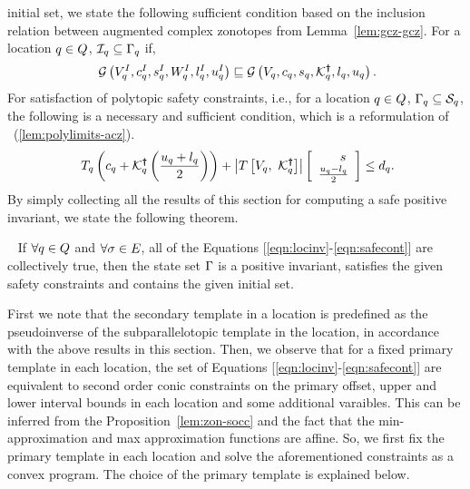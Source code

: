 initial set, we state the following sufficient condition based on the
inclusion relation between augmented complex zonotopes from
Lemma~\ref{lem:gcz-gcz}.
%
 For a location $q \in Q$, $\mathcal{I}_q\subseteq
  \Gamma_q$ if,
\begin{align}~\label{eqn:initcont}
\mathcal{G}\left(V^I_q,c^I_q,s^I_q,W^I_q,l^I_q,u^I_q\right)\sqsubseteq\mathcal{G}\left(V_q,c_q,s_q,\mathcal{K}^{\bm{\dagger}}_q,l_q,u_q\right).
\end{align}
%
For satisfaction of polytopic safety constraints, i.e., for a location
  $q\in Q$, $\Gamma_q\subseteq \mathcal{S}_q$, the
  following is a necessary and sufficient condition, which is a
  reformulation of
   ~(\ref{lem:polylimits-acz}). 
%
\begin{align}~\label{eqn:safecont}
T_q\left(c_q+\mathcal{K}^{\bm{\dagger}}_q\left(\frac{u_q+l_q}{2}\right)\right)+\left|T\left[V_q,~\mathcal{K}^{\bm{\dagger}}_q\right]\right|\left[\begin{array}{c}{\hspace{1.5em}s}\\{\frac{u_q-l_q}{2}} \end{array}\right]\leq d_q.
\end{align}
%
By simply collecting all the results of this section for computing a safe
positive invariant, we state the following theorem.
%
\begin{theorem}~\label{thm:main} If
  $\forall q\in Q$ and $\forall \sigma\in E$, all of
  the Equations [\ref{eqn:locinv}-\ref{eqn:safecont}] are collectively
  true, then the state set $\Gamma$ is a positive invariant,
  satisfies the given safety constraints and contains the given
  initial set.
\end{theorem}

  First we note that the secondary
template in a location is predefined as the pseudoinverse of the
subparallelotopic template in the location, in accordance with the
above results in this section.  Then, we observe that for a fixed
primary template in each location, the set of
Equations [\ref{eqn:locinv}-\ref{eqn:safecont}] are equivalent to
second order conic constraints on the primary offset, upper and lower
interval bounds in each location and some additional varaibles.  This
can be inferred from the Proposition~\ref{lem:zon-socc} and the fact
that the min-approximation and max approximation functions are affine. So, we first fix the primary template in each
location and solve the aforementioned constraints as a convex program.
The choice of the primary template is explained below.

